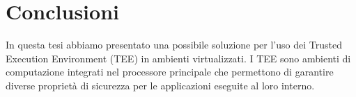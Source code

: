 \documentclass[12pt,italian]{report}
\begin{document}




\chapter{Conclusioni}
\label{chap:conclusioni}
In questa tesi abbiamo presentato una possibile soluzione per l'uso dei
Trusted Execution Environment (TEE) in ambienti virtualizzati.
I TEE sono ambienti di computazione integrati nel processore principale
che permettono di garantire diverse proprietà di sicurezza per le
applicazioni eseguite al loro interno.
\end{document}
